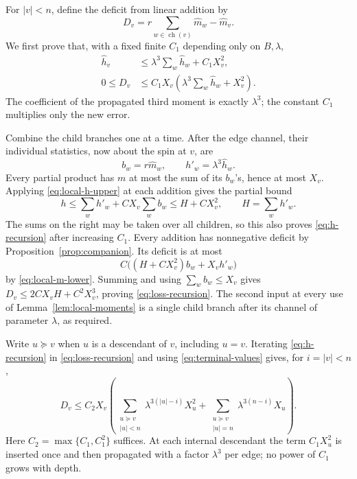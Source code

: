 \documentclass[11pt]{article}
\numberwithin{equation}{section}
\newcommand{\children}{\operatorname{ch}}
\begin{document}
For $|v|<n$, define the deficit from linear addition by
\begin{equation}\label{eq:deficit}
 D_v=r\sum_{w\in\children(v)}\widehat m_w-\widehat m_v.
\end{equation}
We first prove that, with a fixed finite $C_1$ depending only
on $B,\lambda$,
\begin{align}
 \widehat h_v
 &\leq\lambda^3\sum_w\widehat h_w+C_1X_v^2,
      \label{eq:h-recursion}\\
 0\leq D_v
 &\leq C_1X_v\left(\lambda^3\sum_w\widehat h_w+X_v^2\right).
      \label{eq:loss-recursion}
\end{align}
The coefficient of the propagated third moment is exactly
$\lambda^3$; the constant $C_1$ multiplies only the new error.

Combine the child branches one at a time. After the edge channel,
their individual statistics, now about the spin at $v$, are
\[
 b_w=r\widehat m_w,\qquad h'_w=\lambda^3\widehat h_w.
\]
Every partial product has $m$ at most the sum of its $b_w$'s,
hence at most $X_v$. Applying \eqref{eq:local-h-upper} at each
addition gives the partial bound
\[
 h\leq\sum_w h'_w+C X_v\sum_wb_w
   \leq H+CX_v^2,\qquad H=\sum_wh'_w.
\]
The sums on the right may be taken over all children, so this
also proves \eqref{eq:h-recursion} after increasing $C_1$.
Every addition has nonnegative deficit by
Proposition~\ref{prop:companion}. Its deficit is at most
\[
 C\bigl((H+CX_v^2)b_w+X_vh'_w\bigr)
\]
by \eqref{eq:local-m-lower}. Summing and using
$\sum_wb_w\leq X_v$ gives
$D_v\leq2CX_vH+C^2X_v^3$, proving
\eqref{eq:loss-recursion}. The second input at every use of
Lemma~\ref{lem:local-moments} is a single child branch after its
channel of parameter $\lambda$, as required.

Write $u\succeq v$ when $u$ is a descendant of $v$, including
$u=v$. Iterating \eqref{eq:h-recursion} in
\eqref{eq:loss-recursion} and using \eqref{eq:terminal-values}
gives, for $i=|v|<n$,
\begin{equation}\label{eq:unfolded-loss}
 D_v\leq C_2X_v\left(
    \sum_{\substack{u\succeq v\\|u|<n}}
           \lambda^{3(|u|-i)}X_u^2
   +\sum_{\substack{u\succeq v\\|u|=n}}
           \lambda^{3(n-i)}X_u
                   \right).
\end{equation}
Here $C_2=\max\{C_1,C_1^2\}$ suffices. At each internal
descendant the term $C_1X_u^2$ is inserted once and then propagated
with a factor $\lambda^3$ per edge; no power of $C_1$ grows with
depth.
\end{document}
